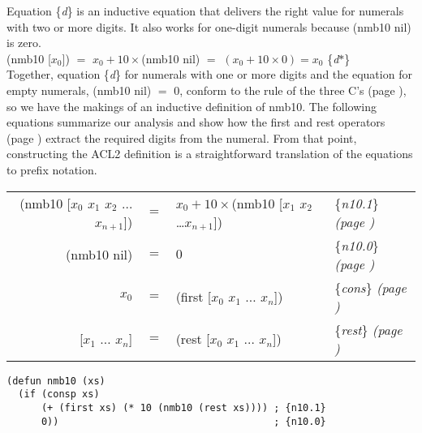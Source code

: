 Equation \{\emph{d}\} is an inductive equation that delivers the right value for
numerals with two or more digits. It also works
for one-digit numerals because (nmb10 nil) is zero.\\
\hspace*{1cm}
\textsf{(nmb10 [$x_0$])} $=$ $x_0 + 10 \times$\textsf{(nmb10 nil)} $=$ $(x_0 + 10 \times 0) = x_0$ \hfill \{\emph{d}$*$\}\\

Together, equation \{\emph{d}\} for numerals with one or more digits
and the equation for empty numerals, \textsf{(nmb10 nil)} $=$ $0$, conform to the
rule of the three C's (page \pageref{fig:inductive-def-keys}),
so we have the makings of an inductive definition of \textsf{nmb10}.
The following equations summarize our analysis and show how
the \textsf{first} and \textsf{rest} operators
(page \pageref{first-rest-cons})
extract the required digits from the numeral.
From that point, constructing the ACL2 definition
is a straightforward translation of the equations to prefix notation.

\begin{center}
\addtolength{\tabcolsep}{-3pt}
\begin{tabular}{rlll}
\textsf{(nmb10 [$x_0$ $x_1$ $x_2$ $\dots$ $x_{n+1}$])} & $=$ &$x_0 + 10\times$\textsf{(nmb10 [$x_1$ $x_2$ \dots $x_{n+1}$])} &\{\emph{n10.1}\} \emph{(page \pageref{nmb10-defun})}\\
\textsf{(nmb10 nil)}                           & $=$ &$0$   &\{\emph{n10.0}\} \emph{(page \pageref{nmb10-defun})}\\
$x_0$                         & $=$ &\textsf{(first [$x_0$ $x_1$ $\dots$ $x_n$])} &\{\emph{cons}\} \emph{(page \pageref{first-rest-cons})}\\
\textsf{{[$x_1$ $\dots$ $x_n$]}}       & $=$ &\textsf{(rest  [$x_0$ $x_1$ $\dots$ $x_n$])} &\{\emph{rest}\} \emph{(page \pageref{first-rest-cons})}\\ %
\end{tabular}
\addtolength{\tabcolsep}{3pt}
\end{center}

\label{nmb10-defun}
\begin{Verbatim}
(defun nmb10 (xs)
  (if (consp xs)
      (+ (first xs) (* 10 (nmb10 (rest xs)))) ; {n10.1}
      0))                                     ; {n10.0}
\end{Verbatim}

